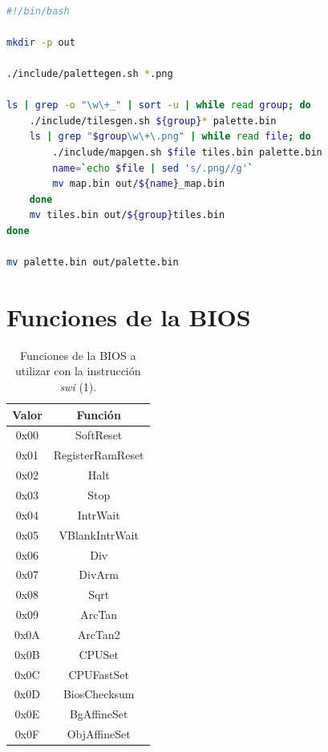 \begin{lstlisting}[language=bash,breaklines=true,caption={Script encargado de procesar todas las imágenes utilizando palettegen.sh, tilesgen.sh y mapgen.sh.},label={lst:ap_map}]

#!/bin/bash

mkdir -p out

./include/palettegen.sh *.png

ls | grep -o "\w\+_" | sort -u | while read group; do
	./include/tilesgen.sh ${group}* palette.bin
	ls | grep "$group\w\+\.png" | while read file; do
		./include/mapgen.sh $file tiles.bin palette.bin
		name=`echo $file | sed 's/.png//g'`
		mv map.bin out/${name}_map.bin
	done
	mv tiles.bin out/${group}tiles.bin
done

mv palette.bin out/palette.bin

\end{lstlisting}

\section{Funciones de la BIOS}\label{ap:bios}

\begin{table}[h]
	\centering
	\begin{tabular}{| c | c |}
		\hline
		\textbf{Valor} & \textbf{Función}  \\ \hline
		0x00 & SoftReset \\ \hline
		0x01 & RegisterRamReset \\ \hline
		0x02 & Halt \\ \hline
		0x03 & Stop \\ \hline
		0x04 & IntrWait \\ \hline
		0x05 & VBlankIntrWait \\ \hline
		0x06 & Div \\ \hline
		0x07 & DivArm \\ \hline
		0x08 & Sqrt \\ \hline
		0x09 & ArcTan \\ \hline
		0x0A & ArcTan2 \\ \hline
		0x0B & CPUSet \\ \hline
		0x0C & CPUFastSet \\ \hline
		0x0D & BiosChecksum \\ \hline
		0x0E & BgAffineSet \\ \hline
		0x0F & ObjAffineSet \\ \hline
	\end{tabular}
	\caption{Funciones de la BIOS a utilizar con la instrucción \textit{swi} (1).}\label{tab:ap_bios_1}
\end{table}

